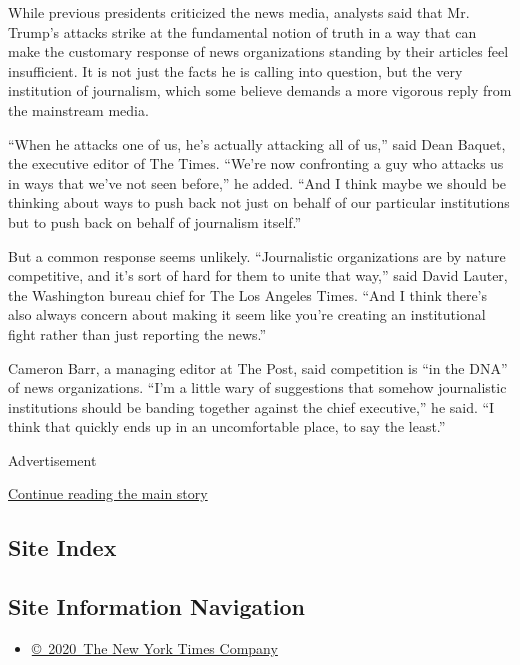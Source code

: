 While previous presidents criticized the news media, analysts said that
Mr. Trump's attacks strike at the fundamental notion of truth in a way
that can make the customary response of news organizations standing by
their articles feel insufficient. It is not just the facts he is calling
into question, but the very institution of journalism, which some
believe demands a more vigorous reply from the mainstream media.

``When he attacks one of us, he's actually attacking all of us,'' said
Dean Baquet, the executive editor of The Times. ``We're now confronting
a guy who attacks us in ways that we've not seen before,'' he added.
``And I think maybe we should be thinking about ways to push back not
just on behalf of our particular institutions but to push back on behalf
of journalism itself.''

But a common response seems unlikely. ``Journalistic organizations are
by nature competitive, and it's sort of hard for them to unite that
way,'' said David Lauter, the Washington bureau chief for The Los
Angeles Times. ``And I think there's also always concern about making it
seem like you're creating an institutional fight rather than just
reporting the news.''

Cameron Barr, a managing editor at The Post, said competition is ``in
the DNA'' of news organizations. ``I'm a little wary of suggestions that
somehow journalistic institutions should be banding together against the
chief executive,'' he said. ``I think that quickly ends up in an
uncomfortable place, to say the least.''

Advertisement

\protect\hyperlink{after-bottom}{Continue reading the main story}

\hypertarget{site-index}{%
\subsection{Site Index}\label{site-index}}

\hypertarget{site-information-navigation}{%
\subsection{Site Information
Navigation}\label{site-information-navigation}}

\begin{itemize}
\tightlist
\item
  \href{https://help.nytimes3xbfgragh.onion/hc/en-us/articles/115014792127-Copyright-notice}{©~2020~The
  New York Times Company}
\end{itemize}


